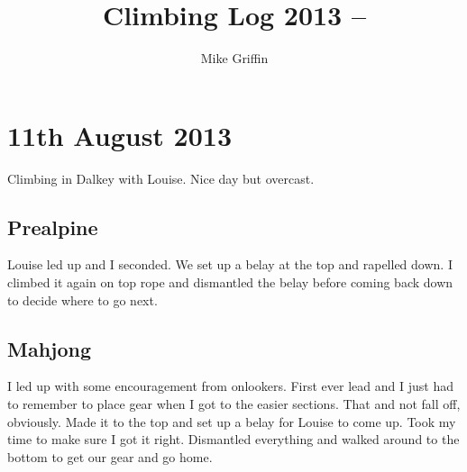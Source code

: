 \documentclass[11pt,a4paper,titlepage]{article}
\begin{document}
\title{Climbing Log 2013 -- }
\author{Mike Griffin}
\date{}

\maketitle

\section*{11th August 2013}

Climbing in Dalkey with Louise. Nice day but overcast.

\subsection*{Prealpine}

Louise led up and I seconded. We set up a belay at the top and rapelled down. I
climbed it again on top rope and dismantled the belay before coming back down to
decide where to go next.

\subsection*{Mahjong}

I led up with some encouragement from onlookers. First ever lead and I just had 
to remember to place gear when I got to the easier sections. That and not fall
off, obviously. Made it to the top and set up a belay for Louise to come up. Took
my time to make sure I got it right. Dismantled everything and walked around to 
the bottom to get our gear and go home.
\end{document}
